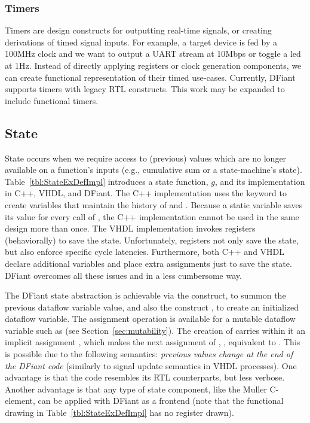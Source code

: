 \subsubsection{Timers}
Timers are design constructs for outputting real-time signals, or creating derivations of timed signal inputs. For example, a target device is fed by a 100MHz clock and we want to output a UART stream at 10Mbps or toggle a led at 1Hz. Instead of directly applying registers or clock generation components, we can create functional representation of their timed use-cases. Currently, DFiant supports timers with legacy RTL constructs. This work may be expanded to include functional timers.

\subsection{State}
State occurs when we require access to (previous) values which are no longer available on a function's inputs (e.g., cumulative sum or a state-machine's state). Table~\ref{tbl:StateExDefImpl} introduces a state function, $g$, and its implementation in C++, VHDL, and DFiant. The C++ implementation uses the  keyword to create variables that maintain the history of  and . Because a static variable saves its value for every call of , the C++ implementation cannot be used in the same design more than once. The VHDL implementation invokes registers (behaviorally) to save the state. Unfortunately, registers not only save the state, but also enforce specific cycle latencies. Furthermore, both C++ and VHDL declare additional variables and place extra assignments just to save the state. DFiant overcomes all these issues and in a less cumbersome way.

The DFiant state abstraction is achievable via the  construct, to summon the previous dataflow variable value, and also the construct , to create an initialized dataflow variable. The \code{:=} assignment operation is available for a mutable dataflow variable such as  (see Section~\ref{sec:mutability}). The creation of  carries within it an implicit assignment , which makes the next assignment of , , equivalent to . This is possible due to the following semantics: \textit{previous values change at the end of the DFiant code} (similarly to signal update semantics in VHDL processes). One advantage is that the code resembles its RTL counterparts, but less verbose. Another advantage is that any type of state component, like the Muller C-element\cite{muller1957theory}, can be applied with DFiant as a frontend (note that the functional drawing in Table~\ref{tbl:StateExDefImpl} has no register drawn).

